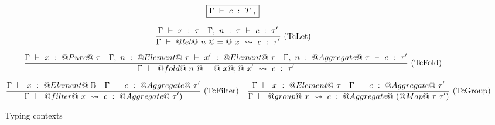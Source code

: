 \begin{figure*}

$$
\boxed{\Gamma ~\vdash~ c ~:~ T_\to}
$$


$$
\frac {\displaystyle 
    \Gamma ~\vdash~ x ~:~ \tau
    \quad
    \Gamma,~n~:~\tau ~\vdash~ c ~:~ \tau'
} {\displaystyle 
    \Gamma ~\vdash~ @let@~n~@=@~x~\leadsto~c ~:~ \tau'
} \ 
\textrm{(TcLet)}
$$

$$
\frac {\displaystyle 
    \Gamma ~\vdash~ x ~:~ @Pure@~\tau
    \quad
    \Gamma,~n~:~@Element@~\tau ~\vdash~ x' ~:~ @Element@~\tau
    \quad
    \Gamma,~n~:~@Aggregate@~\tau ~\vdash~ c ~:~ \tau'
} {\displaystyle 
    \Gamma ~\vdash~ @fold@~n~@=@~x@;@~x'~\leadsto~c ~:~ \tau'
} \ 
\textrm{(TcFold)}
$$

$$
\frac {\displaystyle 
    \Gamma ~\vdash~ x ~:~ @Element@~\mathbb{B}
    \quad
    \Gamma ~\vdash~ c ~:~ @Aggregate@~\tau'
} {\displaystyle 
    \Gamma ~\vdash~ @filter@~x~\leadsto~c ~:~ @Aggregate@~\tau')
} \ 
\textrm{(TcFilter)}
\quad
\frac {\displaystyle 
    \Gamma ~\vdash~ x ~:~ @Element@~\tau
    \quad
    \Gamma ~\vdash~ c ~:~ @Aggregate@~\tau'
} {\displaystyle 
    \Gamma ~\vdash~ @group@~x~\leadsto~c ~:~ @Aggregate@~(@Map@~\tau~\tau')
} \ 
\textrm{(TcGroup)}
$$



\caption{Typing contexts}
\label{fig:source:type:ctx}
\end{figure*}

